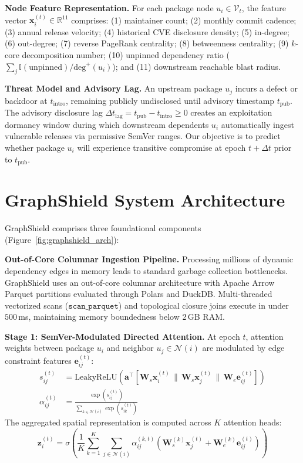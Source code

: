 \documentclass[sigconf,screen]{acmart}
\begin{document}
\noindent\textbf{Node Feature Representation.} For each package node $u_i \in \mathcal{V}_t$, the feature vector $\mathbf{x}_i^{(t)} \in \mathbb{R}^{11}$ comprises:
(1) maintainer count;
(2) monthly commit cadence;
(3) annual release velocity;
(4) historical CVE disclosure density;
(5) in-degree;
(6) out-degree;
(7) reverse PageRank centrality;
(8) betweenness centrality;
(9) $k$-core decomposition number;
(10) unpinned dependency ratio ($\sum_{j} \mathbb{I}(\text{unpinned}) / \text{deg}^+(u_i)$); and
(11) downstream reachable blast radius.

\noindent\textbf{Threat Model and Advisory Lag.} An upstream package $u_j$ incurs a defect or backdoor at $t_{\text{intro}}$, remaining publicly undisclosed until advisory timestamp $t_{\text{pub}}$. The advisory disclosure lag $\Delta t_{\text{lag}} = t_{\text{pub}} - t_{\text{intro}} \ge 0$ creates an exploitation dormancy window during which downstream dependents $u_i$ automatically ingest vulnerable releases via permissive SemVer ranges. Our objective is to predict whether package $u_i$ will experience transitive compromise at epoch $t + \Delta t$ prior to $t_{\text{pub}}$.

\section{GraphShield System Architecture}
\label{sec:architecture}

GraphShield comprises three foundational components (Figure~\ref{fig:graphshield_arch}):

\noindent\textbf{Out-of-Core Columnar Ingestion Pipeline.} Processing millions of dynamic dependency edges in memory leads to standard garbage collection bottlenecks. GraphShield uses an out-of-core columnar architecture with Apache Arrow Parquet partitions evaluated through Polars and DuckDB. Multi-threaded vectorized scans ($\texttt{scan\_parquet}$) and topological closure joins execute in under $500$\,ms, maintaining memory boundedness below 2\,GB RAM.

\noindent\textbf{Stage 1: SemVer-Modulated Directed Attention.} At epoch $t$, attention weights between package $u_i$ and neighbor $u_j \in \mathcal{N}(i)$ are modulated by edge constraint features $\mathbf{e}_{ij}^{(t)}$:
\begin{align}
    s_{ij}^{(t)} &= \text{LeakyReLU}\left(\mathbf{a}^\top [\mathbf{W}_s \mathbf{x}_i^{(t)} \,\|\, \mathbf{W}_s \mathbf{x}_j^{(t)} \,\|\, \mathbf{W}_e \mathbf{e}_{ij}^{(t)}]\right) \\
    \alpha_{ij}^{(t)} &= \frac{\exp\left( s_{ij}^{(t)} \right)}{\sum_{k \in \mathcal{N}(i)} \exp\left( s_{ik}^{(t)} \right)}
\end{align}
The aggregated spatial representation is computed across $K$ attention heads:
\begin{equation}
    \mathbf{z}_i^{(t)} = \sigma \left( \frac{1}{K} \sum_{k=1}^K \sum_{j \in \mathcal{N}(i)} \alpha_{ij}^{(k,t)} \left( \mathbf{W}_s^{(k)} \mathbf{x}_j^{(t)} + \mathbf{W}_e^{(k)} \mathbf{e}_{ij}^{(t)} \right) \right)
\end{equation}
\end{document}
